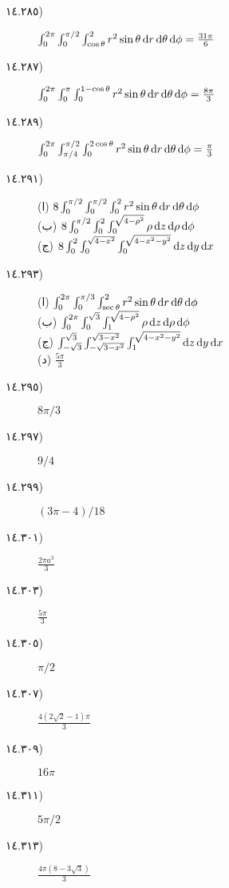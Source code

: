 \begin {description}
\item [
\protect ١٤.\protect ٢٨٥)
]
 \(\int _{0}^{2\pi }\int _{0}^{\pi /2}\int _{\cos \theta }^{2} r^2\sin \theta \dif r\dif \theta \dif \phi =\tfrac {31\pi }{6}\) 
\item [
\protect ١٤.\protect ٢٨٧)
]
 \(\int _{0}^{2\pi }\int _{0}^{\pi }\int _{0}^{1-\cos \theta }r^2\sin \theta \dif r\dif \theta \dif \phi =\tfrac {8\pi }{3}\) 
\item [
\protect ١٤.\protect ٢٨٩)
]
 \(\int _{0}^{2\pi }\int _{\pi /4}^{\pi /2}\int _{0}^{2\cos \theta }r^2\sin \theta \dif r\dif \theta \dif \phi =\tfrac {\pi }{3}\) 
\item [
\protect ١٤.\protect ٢٩١)
]
 (ا) \(8\int _{0}^{\pi /2}\int _{0}^{\pi /2}\int _{0}^{2}r^2\sin \theta \dif r\dif \theta \dif \phi \)\\ (ب) \(8\int _{0}^{\pi /2}\int _{0}^{2}\int _{0}^{\sqrt {4-\rho ^2}}\rho \dif z\dif \rho \dif \phi \)\\ (ج) \(8\int _{0}^{2}\int _{0}^{\sqrt {4-x^2}}\int _{0}^{\sqrt {4-x^2-y^2}}\dif z\dif y\dif x\) 
\item [
\protect ١٤.\protect ٢٩٣)
]
 (ا) \(\int _{0}^{2\pi }\int _{0}^{\pi /3}\int _{\sec \theta }^{2}r^2\sin \theta \dif r\dif \theta \dif \phi \)\\ (ب) \(\int _{0}^{2\pi }\int _{0}^{\sqrt {3}}\int _{1}^{\sqrt {4-\rho ^2}}\rho \dif z\dif \rho \dif \phi \)\\ (ج) \(\int _{-\sqrt {3}}^{\sqrt {3}}\int _{-\sqrt {3-x^2}}^{\sqrt {3-x^2}}\int _{1}^{\sqrt {4-x^2-y^2}}\dif z\dif y\dif x\)\\ (د) \(\tfrac {5\pi }{3}\) 
\item [
\protect ١٤.\protect ٢٩٥)
]
 \(8\pi /3\) 
\item [
\protect ١٤.\protect ٢٩٧)
]
 \(9/4\) 
\item [
\protect ١٤.\protect ٢٩٩)
]
 \((3\pi -4)/18\) 
\item [
\protect ١٤.\protect ٣٠١)
]
 \(\tfrac {2\pi a^3}{3}\) 
\item [
\protect ١٤.\protect ٣٠٣)
]
 \(\tfrac {5\pi }{3}\) 
\item [
\protect ١٤.\protect ٣٠٥)
]
 \(\pi /2\) 
\item [
\protect ١٤.\protect ٣٠٧)
]
 \(\tfrac {4(2\sqrt {2}-1)\pi }{3}\) 
\item [
\protect ١٤.\protect ٣٠٩)
]
 \(16\pi \) 
\item [
\protect ١٤.\protect ٣١١)
]
 \(5\pi /2\) 
\item [
\protect ١٤.\protect ٣١٣)
]
 \(\tfrac {4\pi (8-3\sqrt {3})}{3}\) 

\end{description}
